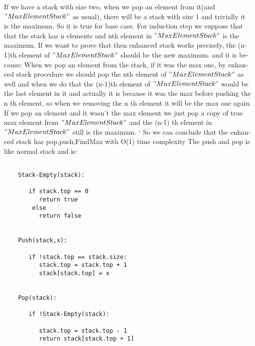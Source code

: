 \documentclass[12pt]{article}
\begin{document}
\begin{latin}
\newline If we have a stack with size two, when we pop an element from it(and $"MaxElementStack"$ as usual), there will be a stack with size 1 and trivially it is the maximum. So it is true for base case.
\newline For induction step we suppose that that the stack has n elements and nth element in $"MaxElementStack"$ is the maximum. If we want to prove that then enhanced stack works precisely, the (n-1)th element of $"MaxElementStack"$ should be the new maximum. and it is because:
\newline When we pop an element from the stack, if it was the max one, by enhanced stack procedure we should pop the nth element of $"MaxElementStack"$ as well and when we do that the (n-1)th element of $"MaxElementStack"$ would be the last element in it and actually it is because it was the max before pushing the n th element, so when we removing the n th element it will be the max one again.
\newline If we pop an element and it wasn't the max element we just pop a copy of true max element from $"MaxElementStack"$ and the (n-1) th element in $"MaxElementStack"$ still is the maximum.
\newline` So we can conclude that the enhanced stack has pop,push,FindMax with O(1) time complexity
\newline The push and pop is like normal stack and is:
\begin{verbatim}
    
    Stack-Empty(stack):
       
       if stack.top == 0
          return true
        else 
          return false
        
        
    Push(stack,x):
       
       if !stack.top == stack.size:
          stack.top = stack.top + 1
          stack[stack.top] = x
          
          
    Pop(stack):
       
       if !Stack-Empty(stack):
          
          stack.top = stack.top - 1
          return stack[stack.top + 1]          
       
    
\end{verbatim}
\end{latin}
\end{document}
